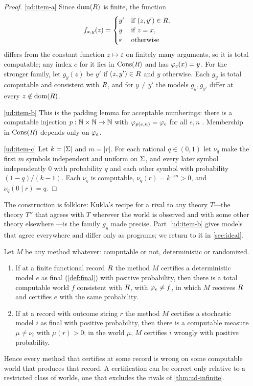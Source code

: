 \begin{proof}
\ref{ud:item-a} Since $\operatorname{dom}(R)$ is finite, the function
\[
  f_{x,y}(z)=
  \begin{cases}
    y' & \text{if } (z,y')\in R,\\
    y  & \text{if } z=x,\\
    \varepsilon & \text{otherwise}
  \end{cases}
\]
differs from the constant function $z\mapsto\varepsilon$ on finitely many arguments,
so it is total computable; any index $e$ for it lies in $\operatorname{Cons}(R)$ and has
$\varphi_{e}(x)=y$. For the stronger family, let $g_y(z)$ be $y'$ if $(z,y')\in R$ and
$y$ otherwise. Each $g_y$ is total computable and consistent with $R$, and for
$y\ne y'$ the models $g_y,g_{y'}$ differ at every $z\notin\operatorname{dom}(R)$.

\ref{ud:item-b} This is the padding lemma for acceptable numberings: there is a
computable injection $p:\mathbb{N}\times\mathbb{N}\to\mathbb{N}$ with $\varphi_{p(e,n)}=\varphi_{e}$ for all $e,n$
\citep[ch.~1]{rogers1967}. Membership in $\operatorname{Cons}(R)$ depends only on $\varphi_{e}$.

\ref{ud:item-c} Let $k=|\Sigma|$ and $m=|r|$. For each rational $q\in(0,1)$ let $\nu_q$ make
the first $m$ symbols independent and uniform on $\Sigma$, and every later symbol
independently $0$ with probability $q$ and each other symbol with probability
$(1-q)/(k-1)$. Each $\nu_q$ is computable, $\nu_q(r)=k^{-m}>0$, and
$\nu_q(0\mid r)=q$.
\end{proof}

The construction is folklore: Kukla's recipe for a rival to any
theory $T$---the theory $T''$ that agrees with $T$ wherever the world is observed and
with some other theory elsewhere \citep{kukla1993}---is the family $g_y$ made precise.
Part~\ref{ud:item-b} gives models that agree everywhere and differ only as programs;
we return to it in \cref{sec:ideal}.

\begin{corollary}[No certification]\label{thm:k1-certify}
Let $M$ be any method whatever: computable or not, deterministic or randomized.
\begin{enumerate}[label=(\alph*)]
  \item\label{k1:item-a} If at a finite functional record $R$ the method $M$
        certifies a deterministic model $e$ as final (\cref{def:final}) with positive
        probability, then there is a total computable world $f$ consistent with $R$,
        with $\varphi_{e}\ne f$, in which $M$ receives $R$ and certifies $e$ with the same
        probability.
  \item\label{k1:item-b} If at a record with outcome string $r$ the method $M$
        certifies a stochastic model $i$ as final with positive probability, then
        there is a computable measure $\mu\ne\nu_i$ with $\mu(r)>0$; in the world $\mu$,
        $M$ certifies $i$ wrongly with positive probability.
\end{enumerate}
Hence every method that certifies at some record is wrong on some computable world
that produces that record. A certification can be correct only relative to a
restricted class of worlds, one that excludes the rivals of \cref{thm:ud-infinite}.
\end{corollary}

